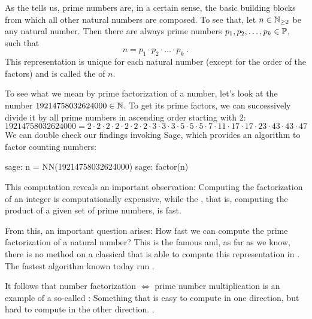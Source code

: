 As the  tells us, prime numbers are, in a certain sense, the basic building blocks from which all other natural numbers are composed. To see that, let $ n \in \mathbb{N}_{\geq 2} $ be any natural number. Then there are always prime numbers $ p_1, p_2, \ldots, p_k \in \mathbb{P} $, such that
\begin{equation}
n = p_1 \cdot p_2 \cdot \ldots \cdot p_k \;.
\end{equation}
This representation is unique for each natural number (except for the order of the factors) and is called the  of $n$.
\begin{example}\label{ex-prime-factorization} To see what we mean by prime factorization of a number, let's look at the number $19214758032624000\in\mathbb{N}$. To get its prime factors, we can successively divide it by all prime numbers in ascending order starting with $2$:
\begin{equation*}
19214758032624000 = 2\cdot 2\cdot 2\cdot 2\cdot 2\cdot 2\cdot 2 \cdot 3\cdot 3\cdot 3\cdot 5\cdot 5\cdot 5\cdot 7 \cdot 11 \cdot 17\cdot 17 \cdot 23 \cdot 43\cdot 43 \cdot 47
\end{equation*}
We can double check our findings invoking Sage, which provides an algorithm to factor counting numbers:
\begin{sagecommandline}
sage: n = NN(19214758032624000)
sage: factor(n)
\end{sagecommandline}
\end{example}
This computation reveals an important observation: Computing the factorization of an integer is computationally expensive, while the , that is, computing the product of a given set of prime numbers, is fast. 

From this, an important question arises: How fast we can compute the prime factorization of a natural number? This is the famous  and, as far as we know, there is no method on a classical  that is able to compute this representation in . The fastest algorithm known today run .

It follows that number factorization $\Leftrightarrow$ prime number multiplication is an example of a so-called  : Something that is easy to compute in one direction, but hard to compute in the other direction. .

